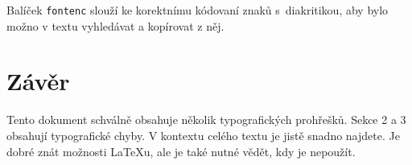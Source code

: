 \documentclass[10pt, a4paper, twocolumn]{article}
\begin{document}
Balíček \texttt{fontenc} slouží ke korektnímu kódovaní znaků s~diakritikou, aby bylo možno v textu vyhledávat a kopírovat z něj.


\section{Závěr}
Tento dokument schválně obsahuje několik typografických prohřešků.
Sekce 2 a 3 obsahují typografické chyby.
V kontextu celého textu je jistě snadno najdete.
Je dobré znát možnosti {\LaTeX}u, ale je také nutné vědět, kdy je nepoužít.
\end{document}

